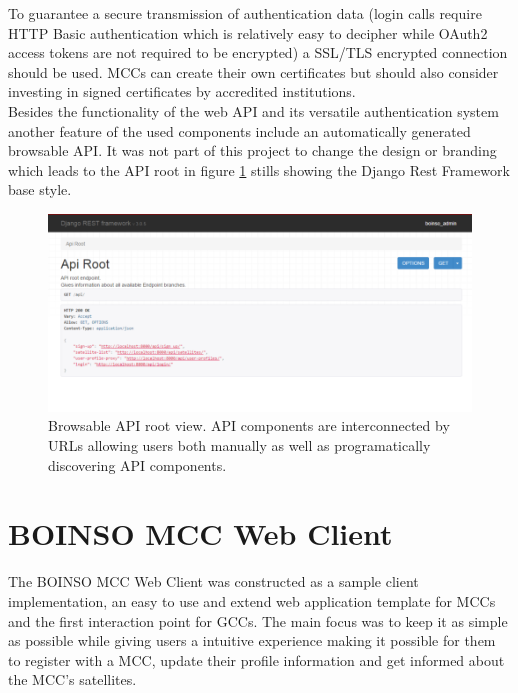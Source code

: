 \documentclass[BachelorPaper]{subfiles}
\begin{document}
To guarantee a secure transmission of authentication data (login calls require \ac{HTTP} Basic authentication which is relatively easy to decipher while OAuth2 access tokens are not required to be encrypted) a \ac{SSL}/\ac{TLS} encrypted connection should be used. \acp{MCC} can create their own certificates but should also consider investing in signed certificates by accredited institutions. \\

Besides the functionality of the web \ac{API} and its versatile authentication system another feature of the used components include an automatically generated browsable \ac{API}. It was not part of this project to change the design or branding which leads to the \ac{API} root in figure \ref{fig:browsable_api_root} stills showing the Django Rest Framework base style.

\begin{figure}[!htbp]
\centering
\includegraphics[width=0.96\linewidth]{PICs/BacPics/api_root.png}
\caption{Browsable API root view. API components are interconnected by URLs allowing users both manually as well as programatically discovering API components.}\label{fig:browsable_api_root}
\end{figure}

\section{BOINSO MCC Web Client}
\label{sec:methods_boinso_web}

The BOINSO MCC Web Client was constructed as a sample client implementation, an easy to use and extend web application template for \acp{MCC} and the first interaction point for \acp{GCC}. The main focus was to keep it as simple as possible while giving users a intuitive experience making it possible for them to register with a \ac{MCC}, update their profile information and get informed about the \ac{MCC}'s satellites.\\
\end{document}

